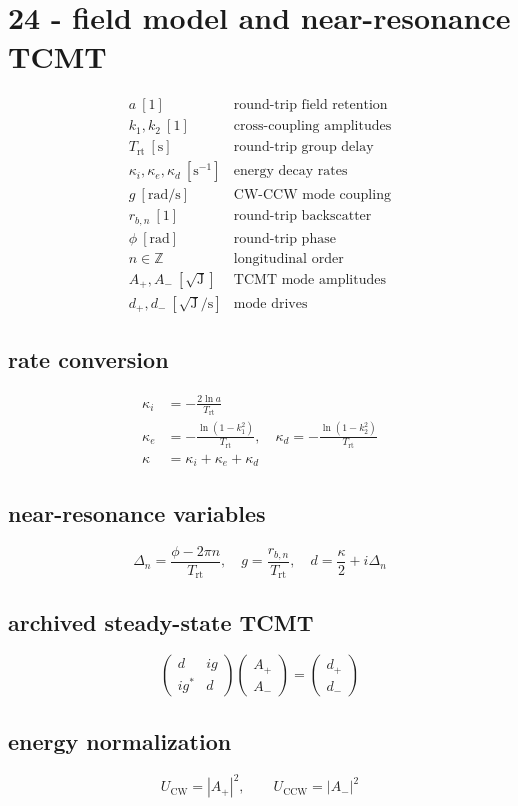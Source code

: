 \section*{24 - field model and near-resonance TCMT}

\[
\begin{array}{ll}a\ [1]&\text{round-trip field retention}\\[0.6em]k_1,k_2\ [1]&\text{cross-coupling amplitudes}\\[0.6em]T_{\mathrm{rt}}\ [\mathrm s]&\text{round-trip group delay}\\[0.6em]\kappa_i,\kappa_e,\kappa_d\ [\mathrm{s}^{-1}]&\text{energy decay rates}\\[0.6em]g\ [\mathrm{rad/s}]&\text{CW-CCW mode coupling}\\[0.6em]r_{b,n}\ [1]&\text{round-trip backscatter}\\[0.6em]\phi\ [\mathrm{rad}]&\text{round-trip phase}\\[0.6em]n\in\mathbb Z&\text{longitudinal order}\\[0.6em]A_+,A_-\ [\sqrt{\mathrm J}]&\text{TCMT mode amplitudes}\\[0.6em]d_+,d_-\ [\sqrt{\mathrm J}/\mathrm s]&\text{mode drives}\end{array}
\]

\subsection*{rate conversion}
\[
\displaystyle \begin{aligned}\kappa_i&=-\frac{2\ln a}{T_{\mathrm{rt}}}\\\kappa_e&=-\frac{\ln(1-k_1^2)}{T_{\mathrm{rt}}},\quad\kappa_d=-\frac{\ln(1-k_2^2)}{T_{\mathrm{rt}}}\\\kappa&=\kappa_i+\kappa_e+\kappa_d\end{aligned}
\]

\subsection*{near-resonance variables}
\[
\displaystyle \Delta_n=\frac{\phi-2\pi n}{T_{\mathrm{rt}}},\quad g=\frac{r_{b,n}}{T_{\mathrm{rt}}},\quad d=\frac\kappa2+i\Delta_n
\]

\subsection*{archived steady-state TCMT}
\[
\displaystyle \begin{pmatrix}d&ig\\ig^*&d\end{pmatrix}\begin{pmatrix}A_+\\A_-\end{pmatrix}=\begin{pmatrix}d_+\\d_-\end{pmatrix}
\]

\subsection*{energy normalization}
\[
\displaystyle U_{\mathrm{CW}}=|A_+|^2,\qquad U_{\mathrm{CCW}}=|A_-|^2
\]
